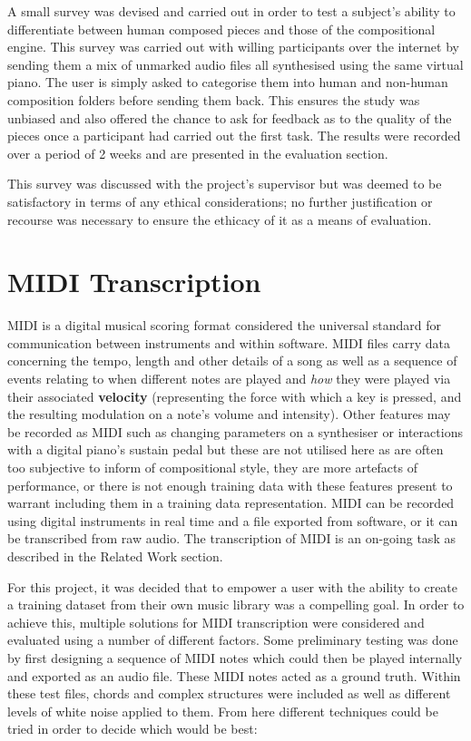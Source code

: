 \documentclass[12pt,]{article}
\begin{document}
A small survey was devised and carried out in order to test a subject's
ability to differentiate between human composed pieces and those of the
compositional engine. This survey was carried out with willing
participants over the internet by sending them a mix of unmarked audio
files all synthesised using the same virtual piano. The user is simply
asked to categorise them into human and non-human composition folders
before sending them back. This ensures the study was unbiased and also
offered the chance to ask for feedback as to the quality of the pieces
once a participant had carried out the first task. The results were
recorded over a period of 2 weeks and are presented in the evaluation
section.

This survey was discussed with the project's supervisor but was deemed
to be satisfactory in terms of any ethical considerations; no further
justification or recourse was necessary to ensure the ethicacy of it as
a means of evaluation.

\hypertarget{midi-transcription}{%
\section{MIDI Transcription}\label{midi-transcription}}

MIDI is a digital musical scoring format considered the universal
standard for communication between instruments and within software. MIDI
files carry data concerning the tempo, length and other details of a
song as well as a sequence of events relating to when different notes
are played and \emph{how} they were played via their associated
\textbf{velocity} (representing the force with which a key is pressed,
and the resulting modulation on a note's volume and intensity). Other
features may be recorded as MIDI such as changing parameters on a
synthesiser or interactions with a digital piano's sustain pedal but
these are not utilised here as are often too subjective to inform of
compositional style, they are more artefacts of performance, or there is
not enough training data with these features present to warrant
including them in a training data representation. MIDI can be recorded
using digital instruments in real time and a file exported from
software, or it can be transcribed from raw audio. The transcription of
MIDI is an on-going task as described in the Related Work section.

For this project, it was decided that to empower a user with the ability
to create a training dataset from their own music library was a
compelling goal. In order to achieve this, multiple solutions for MIDI
transcription were considered and evaluated using a number of different
factors. Some preliminary testing was done by first designing a sequence
of MIDI notes which could then be played internally and exported as an
audio file. These MIDI notes acted as a ground truth. Within these test
files, chords and complex structures were included as well as different
levels of white noise applied to them. From here different techniques
could be tried in order to decide which would be best:
\end{document}
